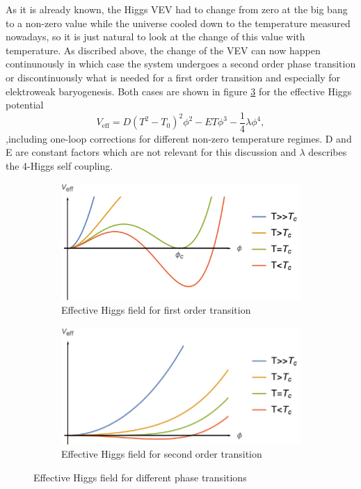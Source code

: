 As it is already known, the Higgs VEV had to change from zero at the big bang to a non-zero value while the universe cooled down to the temperature measured nowadays, so it is just natural to look at the change of this value with temperature. As discribed above, the change of the VEV can now happen continunously in which case the system undergoes a second order phase transition or discontinuously what is needed for a first order transition and especially for elektroweak baryogenesis. 
Both cases are shown in figure \ref{fig:higgs} for the effective Higgs potential
\begin{equation}
	V_\text{eff}=D(T^2-T_0)^2\phi^2-ET\phi^3-\frac{1}{4}\lambda\phi^4,
	\label{effective_pot}
\end{equation}
,including one-loop corrections \cite{Petropoulos:2003pm} for different non-zero temperature regimes. D and E are constant factors which are not relevant for this discussion and $\lambda$ describes the 4-Higgs self coupling.
\begin{figure}[H]
	\centering
	\begin{subfigure}{0.7\textwidth}
		\includegraphics[width=\linewidth]{Images/Higgs1}
		\caption{Effective Higgs field for first order transition}
		\label{fig:higgs1}	
	\end{subfigure}
	\begin{subfigure}{0.7\textwidth}
		\includegraphics[width=\linewidth]{Images/Higgs2}
		\caption{Effective Higgs field for second order transition}
		\label{fig:higgs2}
	\end{subfigure}
	\caption{Effective Higgs field for different phase transitions}
	\label{fig:higgs}
\end{figure}
